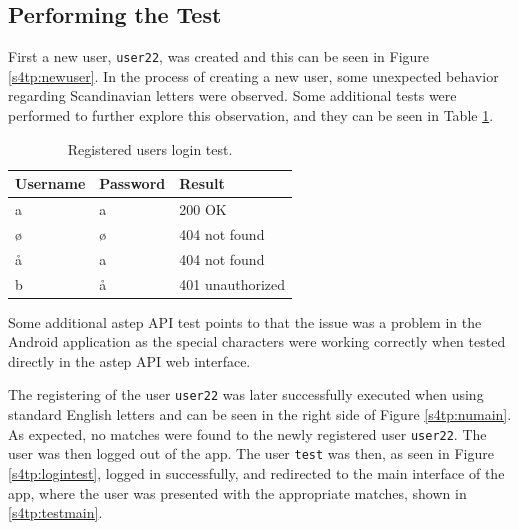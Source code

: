 \subsection{Performing the Test}
First a new user, \texttt{user22}, was created and this can be seen in Figure \ref{s4tp:newuser}.
In the process of creating a new user, some unexpected behavior regarding Scandinavian letters were observed.
Some additional tests were performed to further explore this observation, and they can be seen in Table \ref{tab:logintest}.
\begin{table}[!ht]
	\centering
	\begin{tabular}{@{}lll@{}}
		Username & Password & Result \\
		\hline
		a & a & 200 OK\\
		ø & ø & 404 not found\\
		å & a & 404 not found\\
		b & å & 401 unauthorized\\
	\end{tabular}
	\caption{Registered users login test.}
	\label{tab:logintest}
\end{table}

Some additional \gls{astep} API test points to that the issue was a problem in the Android application as the special characters were working correctly when tested directly in the \gls{astep} API web interface.

The registering of the user \texttt{user22} was later successfully executed when using standard English letters and can be seen in the right side of Figure \ref{s4tp:numain}. 
As expected, no matches were found to the newly registered user \texttt{user22}. 
The user was then logged out of the app.
The user \texttt{test} was then, as seen in Figure \ref{s4tp:logintest}, logged in successfully, and redirected to the main interface of the app, where the user was presented with the appropriate matches, shown in \ref{s4tp:testmain}.

